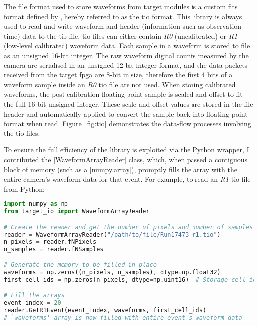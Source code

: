 The file format used to store waveforms from \gls{target} modules is a custom \gls{fits} format defined by , hereby referred to as the \gls{tio} format. This library is always used to read and write waveform and header (information such as observation time) data to the \gls{tio} file. \gls{tio} files can either contain \textit{R0} (uncalibrated)  or \textit{R1} (low-level calibrated) waveform data. Each sample in a waveform is stored to file as an unsigned 16-bit integer. The raw waveform digital counts measured by the camera are serialised in an unsigned 12-bit integer format, and the data packets received from the \gls{target} \gls{fpga} are 8-bit in size, therefore the first 4 bits of a waveform sample inside an \textit{R0} \gls{tio} file are not used. When storing calibrated waveforms, the post-calibration floating-point sample is scaled and offset to fit the full 16-bit unsigned integer. These scale and offset values are stored in the file header and automatically applied to convert the sample back into floating-point format when read. Figure~\ref{fig:tio} demonstrates the data-flow processes involving the \gls{tio} files.

To ensure the full efficiency of the \cpp library is exploited via the Python wrapper, I contributed the |WaveformArrayReader| class, which, when passed a contiguous block of memory (such as a \lstset{language=Python}|numpy.array|), promptly fills the array with the entire camera's waveform data for that event. For example, to read an \textit{R1} \gls{tio} file from Python:

\begin{lstlisting}[language=Python]
import numpy as np
from target_io import WaveformArrayReader

# Create the reader and get the number of pixels and number of samples from the header
reader = WaveformArrayReader("/path/to/file/Run17473_r1.tio")
n_pixels = reader.fNPixels
n_samples = reader.fNSamples

# Generate the memory to be filled in-place
waveforms = np.zeros((n_pixels, n_samples), dtype=np.float32)
first_cell_ids = np.zeros(n_pixels, dtype=np.uint16)  # Storage cell id for the first sample of the event per pixel

# Fill the arrays
event_index = 20
reader.GetR1Event(event_index, waveforms, first_cell_ids)
# `waveforms' array is now filled with entire event's waveform data
\end{lstlisting}

\subsection{}


